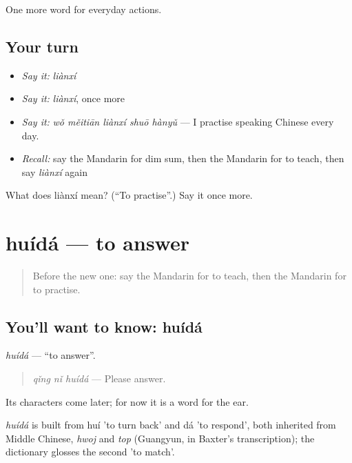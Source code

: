 \begin{grammarlens}[title={What you've built}]
One more word for everyday actions.
\end{grammarlens}

\subsection*{Your turn}
\begin{itemize}
\raggedright
  \item \emph{Say it:} \emph{liànxí}
  \item \emph{Say it:} \emph{liànxí}, once more
  \item \emph{Say it:} \emph{wǒ měitiān liànxí shuō hànyǔ} — I practise speaking Chinese every day.
  \item \emph{Recall:} say the Mandarin for dim sum, then the Mandarin for to teach, then say \emph{liànxí} again
\end{itemize}

\begin{tcolorbox}[breakable,colback=teal!4,colframe=teal!35!black,title={Before you move on}]
What does liànxí mean? (\textquotedblleft{}To practise\textquotedblright{}.) Say it once more.
\end{tcolorbox}
\section[huídá]{huídá — to answer}

\label{lesson:ZH-C121-huida}



\begin{quote}
Before the new one: say the Mandarin for to teach, then the Mandarin for to practise.
\end{quote}

\subsection*{You'll want to know: huídá}
\emph{huídá} — \textquotedblleft{}to answer\textquotedblright{}.

\begin{quote}
\emph{qǐng nǐ huídá} — Please answer.
\end{quote}

Its characters come later; for now it is a word for the ear.

\begin{cousinweb}
\emph{huídá} is built from huí 'to turn back' and dá 'to respond', both inherited from Middle Chinese, \emph{hwoj} and \emph{top} (Guangyun, in Baxter's transcription); the dictionary glosses the second 'to match'.
\end{cousinweb}

